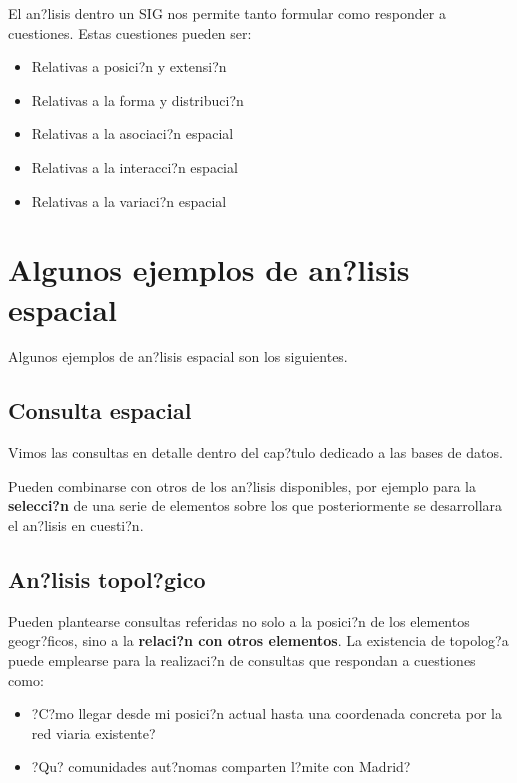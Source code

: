 El an?lisis dentro un SIG nos permite tanto formular como responder a cuestiones. Estas cuestiones pueden ser:

\begin{itemize}
 \item Relativas a posici?n y extensi?n
\item Relativas a la forma y distribuci?n
\item Relativas a la asociaci?n espacial
\item Relativas a la interacci?n espacial
\item Relativas a la variaci?n espacial
\end{itemize}

\section{Algunos ejemplos de an?lisis espacial}

Algunos ejemplos de an?lisis espacial son los siguientes.

\subsection{Consulta espacial}

Vimos las consultas en detalle dentro del cap?tulo dedicado a las bases de datos.

Pueden combinarse con otros de los an?lisis disponibles, por ejemplo para la \textbf{selecci?n} de una serie de elementos sobre los que posteriormente se desarrollara el an?lisis en cuesti?n.

\subsection{An?lisis topol?gico}

Pueden plantearse consultas referidas no solo a la posici?n de los elementos geogr?ficos, sino a la \textbf{relaci?n con otros elementos}. La existencia de topolog?a puede emplearse para la realizaci?n de consultas que respondan a cuestiones como:

\begin{itemize}
\item ?C?mo llegar desde mi posici?n actual hasta una coordenada concreta por la red viaria existente?

\item ?Qu? comunidades aut?nomas comparten l?mite con Madrid?
\end{itemize}

